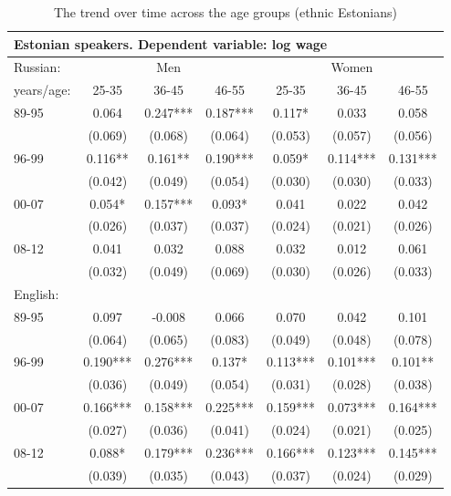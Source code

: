 \documentclass[12pt, a4paper]{article}
\begin{document}
\begin{table}[htbp]
	\centering
	\caption{The trend over time across the age groups (ethnic Estonians)}
	\begin{tabular}{lccc|cc c}
          \toprule
		\multicolumn{7}{l}{Estonian speakers. Dependent variable: log wage}          \\ \hline
		Russian:   &    \multicolumn{3}{c|}{Men}    &   \multicolumn{3}{c}{Women}    \\
		years/age: & 25-35    & 36-45    & 46-55    & 25-35    & 36-45    & 46-55    \\ \midrule
		89-95      & 0.064    & 0.247*** & 0.187*** & 0.117*   & 0.033    & 0.058    \\
		           & (0.069)  & (0.068)  & (0.064)  & (0.053)  & (0.057)  & (0.056)  \\
		96-99      & 0.116**  & 0.161**  & 0.190*** & 0.059*   & 0.114*** & 0.131*** \\
		           & (0.042)  & (0.049)  & (0.054)  & (0.030)  & (0.030)  & (0.033)  \\
		00-07      & 0.054*   & 0.157*** & 0.093*   & 0.041    & 0.022    & 0.042    \\
		           & (0.026)  & (0.037)  & (0.037)  & (0.024)  & (0.021)  & (0.026)  \\
		08-12      & 0.041    & 0.032    & 0.088    & 0.032    & 0.012    & 0.061    \\
		           & (0.032)  & (0.049)  & (0.069)  & (0.030)  & (0.026)  & (0.033)  \\ \hline
		English:   &          &          &          &          &          &          \\
		89-95      & 0.097    & -0.008   & 0.066    & 0.070    & 0.042    & 0.101    \\
		           & (0.064)  & (0.065)  & (0.083)  & (0.049)  & (0.048)  & (0.078)  \\
		96-99      & 0.190*** & 0.276*** & 0.137*   & 0.113*** & 0.101*** & 0.101**  \\
		           & (0.036)  & (0.049)  & (0.054)  & (0.031)  & (0.028)  & (0.038)  \\
		00-07      & 0.166*** & 0.158*** & 0.225*** & 0.159*** & 0.073*** & 0.164*** \\
		           & (0.027)  & (0.036)  & (0.041)  & (0.024)  & (0.021)  & (0.025)  \\
		08-12      & 0.088*   & 0.179*** & 0.236*** & 0.166*** & 0.123*** & 0.145*** \\
		           & (0.039)  & (0.035)  & (0.043)  & (0.037)  & (0.024)  & (0.029)  \\ 

\end{tabular}
\end{table}
\end{document}
